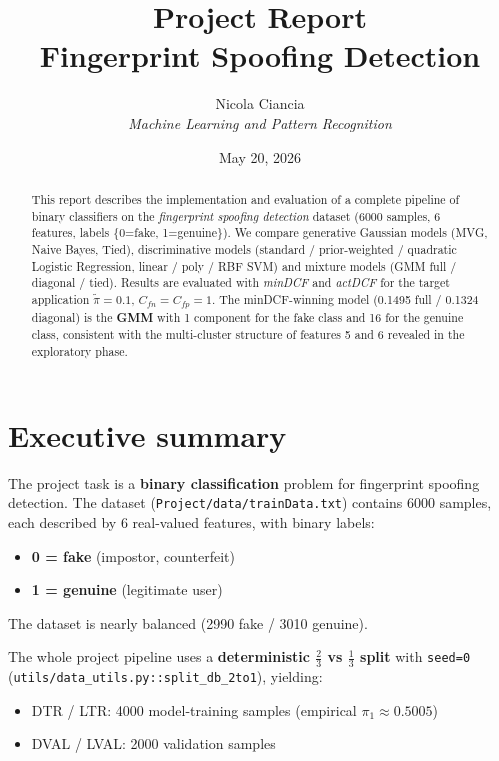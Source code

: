 \documentclass[11pt,a4paper]{article}
\title{\textbf{Project Report}\\[0.3em]
       \Large Fingerprint Spoofing Detection}
\author{Nicola Ciancia\\[0.2em]
        \small\textit{Machine Learning and Pattern Recognition}}
\date{May 20, 2026}
\begin{document}
\maketitle

\begin{abstract}
\noindent
This report describes the implementation and evaluation of a complete
pipeline of binary classifiers on the \emph{fingerprint spoofing
detection} dataset (6000 samples, 6 features, labels \{0=fake,
1=genuine\}). We compare generative Gaussian models (MVG, Naive Bayes,
Tied), discriminative models (standard / prior-weighted / quadratic
Logistic Regression, linear / poly / RBF SVM) and mixture models
(GMM full / diagonal / tied). Results are evaluated with \emph{minDCF}
and \emph{actDCF} for the target application $\tilde{\pi}=0.1,\,
C_{fn}=C_{fp}=1$. The minDCF-winning model (0.1495 full / 0.1324
diagonal) is the \textbf{GMM} with 1 component for the fake class and
16 for the genuine class, consistent with the multi-cluster structure
of features 5 and 6 revealed in the exploratory phase.
\end{abstract}

\tableofcontents
\newpage

\section{Executive summary}\label{sec:exec}

The project task is a \textbf{binary classification} problem for
fingerprint spoofing detection. The dataset
(\texttt{Project/data/trainData.txt}) contains 6000 samples, each
described by 6 real-valued features, with binary labels:
\begin{itemize}
\item \textbf{0 = fake} (impostor, counterfeit)
\item \textbf{1 = genuine} (legitimate user)
\end{itemize}

The dataset is nearly balanced (2990 fake / 3010 genuine).

The whole project pipeline uses a \textbf{deterministic
$\tfrac{2}{3}$ vs $\tfrac{1}{3}$ split} with \texttt{seed=0}
(\texttt{utils/data\_utils.py::split\_db\_2to1}), yielding:
\begin{itemize}
\item DTR / LTR: 4000 model-training samples (empirical $\pi_1 \approx 0.5005$)
\item DVAL / LVAL: 2000 validation samples
\end{itemize}
\end{document}
